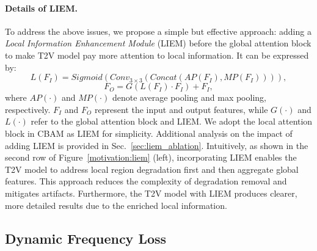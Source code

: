 \paragraph{Details of LIEM.}
To address the above issues, we propose a simple but effective approach: adding a \textit{Local Information Enhancement Module} (LIEM) before the global attention block to make T2V model pay more attention to local information. It can be expressed by:
\begin{equation}
    L(F_I) = Sigmoid(Conv_{3\times3}(Concat(AP(F_I), MP(F_I)))),
\end{equation}
\begin{equation}
    F_O = G(L(F_I) \cdot F_I) + F_I,
\end{equation}
where $AP(\cdot)$ and $MP(\cdot)$ denote average pooling and max pooling, respectively. $F_I$ and $F_O$ represent the input and output features, while $G(\cdot)$ and $L(\cdot)$ refer to the global attention block and LIEM. We adopt the local attention block in CBAM \cite{woo2018cbam} as LIEM for simplicity. 
Additional analysis on the impact of adding LIEM is provided in Sec.~\ref{sec:liem_ablation}.
%
%
Intuitively, as shown in the second row of Figure~\ref{motivation:liem} (left), %
incorporating LIEM enables the T2V model to address local region degradation first and then aggregate global features. 
This approach reduces the complexity of degradation removal and mitigates artifacts. 
Furthermore, the T2V model with LIEM produces clearer, more detailed results due to the enriched local information.
 
\subsection{Dynamic Frequency Loss}
\label{subsec:daf}


